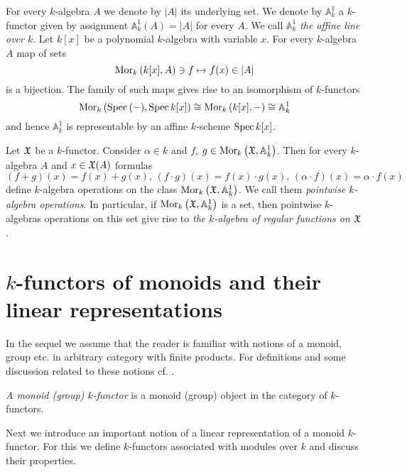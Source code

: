 \begin{example}
For every $k$-algebra $A$ we denote by $|A|$ its underlying set. We denote by $\mathbb{A}^1_k$ a $k$-functor given by assignment $\mathbb{A}^1_k(A)=|A|$ for every $A$. We call $\mathbb{A}^1_k$ \textit{the affine line over $k$}. Let $k[x]$ be a polynomial $k$-algebra with variable $x$. For every $k$-algebra $A$ map of sets 
$$\mathrm{Mor}_{k}\left(k[x],A\right)\ni f \mapsto f(x)\in |A|$$
is a bijection. The family of such maps gives rise to an isomorphism of $k$-functors 
$$\mathrm{Mor}_k\left(\mathrm{Spec}\,(-),\mathrm{Spec}\, k[x]\right)\cong \mathrm{Mor}_k\left(k[x],-\right)\cong \mathbb{A}^1_k$$
and hence $\mathbb{A}^1_k$ is representable by an affine $k$-scheme $\mathrm{Spec}\, k[x]$.
\end{example}

\begin{definition}
Let ${\mathfrak X}$ be a $k$-functor. Consider $\alpha \in k$ and $f$, $g\in \mathrm{Mor}_k\left({\mathfrak X}, \mathbb{A}^1_k\right)$. Then for every $k$-algebra $A$ and $x\in {\mathfrak X}(A)$ formulas
$$\left(f+g\right)(x) = f(x)+g(x),\,\left(f\cdot g\right)(x) = f(x)\cdot g(x),\,\left(\alpha \cdot f\right)(x) = \alpha \cdot f(x)$$
define $k$-algebra operations on the class $\mathrm{Mor}_k\left({\mathfrak X},\mathbb{A}^1_k\right)$. We call them \textit{pointwise $k$-algebra operations}. In particular, if $\mathrm{Mor}_k\left({\mathfrak X},\mathbb{A}^1_k\right)$ is a set, then pointwise $k$-algebras operations on this set give rise to \textit{the $k$-algebra of regular functions on ${\mathfrak X}$}.
\end{definition}


\section{$k$-functors of monoids and their linear representations}
\noindent
In the sequel we assume that the reader is familiar with notions of a monoid, group etc. in arbitrary category with finite products. For definitions and some discussion related to these notions cf. {\cite[pages 2-5]{Maclane}}.

\begin{definition}
\textit{A monoid (group) $k$-functor} is a monoid (group) object in the category of $k$-functors.
\end{definition}
\noindent
Next we introduce an important notion of a linear representation of a monoid $k$-functor. For this we define $k$-functors associated with modules over $k$ and discuss their properties.


